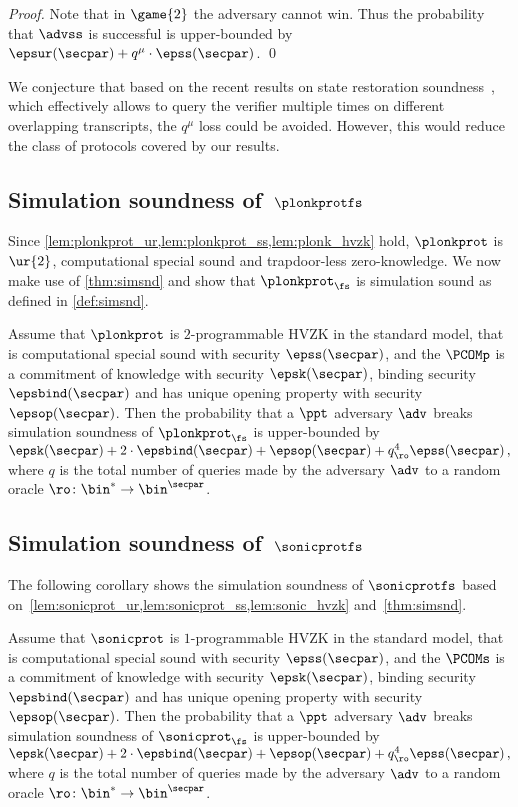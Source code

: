 \begin{proof}
	Note that in $\game{2}$ the adversary cannot win. Thus the probability
	that $\advss$ is successful is upper-bounded by
	$\epsur(\secpar) + q^{\mu} \cdot \epss(\secpar)$.  \qed
\end{proof}


We conjecture that based on the recent results on state restoration soundness~\cite{cryptoeprint:2020:1351}, which effectively allows to query the verifier multiple times on different overlapping transcripts, the $q^{\mu}$ loss could be avoided. However, this would reduce the class of protocols covered by our results. 


\subsection{Simulation soundness of~$\plonkprotfs$}
Since \cref{lem:plonkprot_ur,lem:plonkprot_ss,lem:plonk_hvzk} hold, $\plonkprot$ is $\ur{2}$, computational special sound and trapdoor-less zero-knowledge. We now make use of \cref{thm:simsnd} and show that
$\plonkprot_\fs$ is simulation sound as defined in
\cref{def:simsnd}.

 \begin{corollary}
   \label{cor:simsnd-P}
   Assume that $\plonkprot$ is $2$-programmable HVZK in the standard model, that
   is computational special sound with security $\epss(\secpar)$, and the $\PCOMp$ is a commitment of knowledge with
   security $\epsk(\secpar)$, binding security $\epsbind(\secpar)$ and has unique
   opening property with security $\epsop(\secpar)$. Then the probability that a
   $\ppt$ adversary $\adv$ breaks simulation soundness of $\plonkprot_{\fs}$ is
   upper-bounded by
   \( \epsk(\secpar) + 2\cdot\epsbind(\secpar) + \epsop(\secpar) + q_\ro^4
   \epss(\secpar)\,, \) where $q$ is the total number of queries made by the
   adversary $\adv$ to a random oracle $\ro\colon \bin^{*} \to \bin^{\secpar}$.
 \end{corollary}

\subsection{Simulation soundness of~$\sonicprotfs$}
The following corollary shows the simulation soundness of $\sonicprotfs$ based on~\cref{lem:sonicprot_ur,lem:sonicprot_ss,lem:sonic_hvzk} and~\cref{thm:simsnd}.
\begin{corollary}
	\label{cor:simsnd-S}
	Assume that $\sonicprot$ is $1$-programmable HVZK in the standard model, that
	is computational special sound with security $\epss(\secpar)$, and the $\PCOMs$ is a commitment of knowledge with
	security $\epsk(\secpar)$, binding security $\epsbind(\secpar)$ and has unique
	opening property with security $\epsop(\secpar)$. Then the probability that a
	$\ppt$ adversary $\adv$ breaks simulation soundness of $\sonicprot_{\fs}$ is
	upper-bounded by
	\( \epsk(\secpar) + 2\cdot\epsbind(\secpar) + \epsop(\secpar) + q_\ro^4
	\epss(\secpar)\,, \) where $q$ is the total number of queries made by the
	adversary $\adv$ to a random oracle $\ro\colon \bin^{*} \to \bin^{\secpar}$.
\end{corollary}

